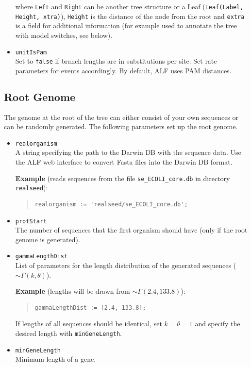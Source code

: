 \documentclass[11pt]{article}
\begin{document}
\begin{itemize}
\noindent where \texttt{Left} and \texttt{Right} can be another tree structure or a Leaf (\texttt{Leaf(Label, Height, xtra)}), \texttt{Height} is the distance of the node from the root and \texttt{extra} is a field for additional information (for example used to annotate the tree with model switches, see below).

\item{\texttt{unitIsPam}} \hfill \\
Set to \texttt{false} if branch lengths are in substitutions per site. Set rate parameters for events accordingly. By default, ALF uses PAM distances.
\end{itemize}

\subsection{Root Genome}
The genome at the root of the tree can either consist of your own sequences or can be randomly generated. The following parameters set up the root genome.
\begin{itemize}
\item{\texttt{realorganism}} \hfill \\
 A string specifying the path to the Darwin DB with the sequence data. Use the ALF web interface to convert Fasta files into the Darwin DB format.

\noindent \textbf{Example} (reads sequences from the file \texttt{se\_ECOLI\_core.db} in directory \texttt{realseed}):
\begin{quote}
\begin{verbatim}
realorganism := 'realseed/se_ECOLI_core.db';
\end{verbatim}
\end{quote}
\item{\texttt{protStart}} \hfill \\
The number of sequences that the first organism should have (only if the root genome is generated).
\item{\texttt{gammaLengthDist}} \hfill \\
List of parameters for the length distribution of the generated sequences ($\sim\Gamma(k,\theta)$). 

\noindent \textbf{Example} (lengths will be drawn from $\sim\Gamma(2.4,133.8)$):
\begin{quote}
\begin{verbatim}
gammaLengthDist := [2.4, 133.8];
\end{verbatim}
\end{quote}
If lengths of all sequences should be identical, set $k=\theta=1$ and specify the desired length with \texttt{minGeneLength}.

\item{\texttt{minGeneLength}} \hfill \\
Minimum length of a gene.
\end{itemize}
\end{document}
